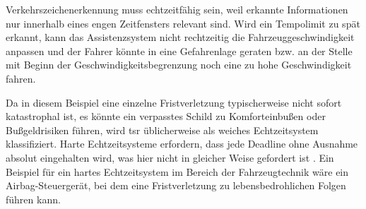 \documentclass[
%
ngerman %
%
numeric %
]{wbh-assignment}
\begin{document}
Verkehrszeichenerkennung muss echtzeitfähig sein, weil erkannte Informationen nur innerhalb eines engen Zeitfensters relevant sind.
Wird ein Tempolimit zu spät erkannt, kann das Assistenzsystem nicht rechtzeitig die Fahrzeuggeschwindigkeit anpassen und der Fahrer könnte in eine Gefahrenlage geraten bzw. an der Stelle mit Beginn der Geschwindigkeitsbegrenzung noch eine zu hohe Geschwindigkeit fahren.

Da in diesem Beispiel eine einzelne Fristverletzung typischerweise nicht sofort katastrophal ist, es könnte ein verpasstes Schild zu Komforteinbußen oder Bußgeldrisiken führen, wird \ac{tsr} üblicherweise als weiches Echtzeitsystem klassifiziert.
Harte Echtzeitsysteme erfordern, dass jede Deadline ohne Ausnahme absolut eingehalten wird, was hier nicht in gleicher Weise gefordert ist \cite{HowAchieveDeterministic}.
Ein Beispiel für ein hartes Echtzeitsystem im Bereich der Fahrzeugtechnik wäre ein Airbag-Steuergerät, bei dem eine Fristverletzung zu lebensbedrohlichen Folgen führen kann.

\clearpage

\cleardoublepage

\appendix
{}
\setcounter{page}{1}

\makeatletter
\renewcommand\chapter{\@startsection{chapter}{0}{\z@}%
	{-3.5ex \@plus -1ex \@minus -.2ex}%
	{2.3ex \@plus.2ex}%
	{\normalfont\Large\bfseries}}
\makeatother

\begingroup
\raggedright
\printbibliography
\endgroup

\nopagebreak
\printnoidxglossary[type=\acronymtype] %

\nopagebreak
\listoffigures %


\nopagebreak
\lstlistoflistings %

\end{document}
